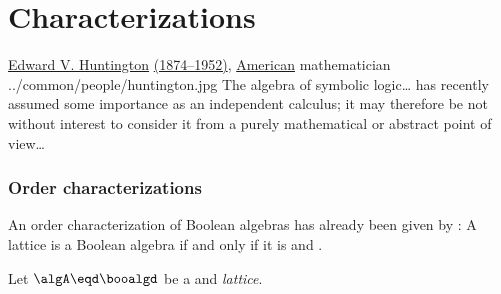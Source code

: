 \section{Characterizations}
\qboxnps
  {\href{http://en.wikipedia.org/wiki/Edward_V._Huntington}{Edward V. Huntington}
   \href{http://www-history.mcs.st-andrews.ac.uk/Timelines/TimelineF.html}{(1874--1952)},
   \href{http://www-history.mcs.st-andrews.ac.uk/BirthplaceMaps/Places/USA.html}{American} mathematician\footnotemark
  }
  {../common/people/huntington.jpg}
  {The algebra of symbolic logic\ldots
   has recently assumed some importance as an independent calculus;
   it may therefore be not without interest to consider it from a purely mathematical or 
   abstract point of view\ldots%
  }


\subsubsection{Order characterizations}
An order characterization of Boolean algebras has already been given by : 
A lattice is a Boolean algebra if and only if it is 
 and .

\begin{proposition}
\label{prop:boo_char_elkan}
Let $\algA\eqd\booalgd$ be a  and  \emph{lattice}.
\end{proposition}


